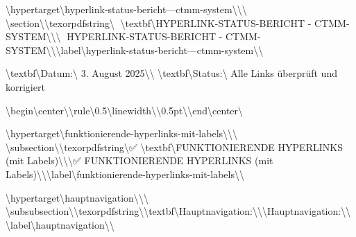 \textbackslash{}hypertarget\textbackslash{}{hyperlink-status-bericht---ctmm-system\textbackslash{}}\textbackslash{}{\textbackslash{}%
\textbackslash{}section\textbackslash{}{\textbackslash{}texorpdfstring\textbackslash{}{🔗 \textbackslash{}textbf\textbackslash{}{HYPERLINK-STATUS-BERICHT - CTMM-SYSTEM\textbackslash{}}\textbackslash{}}\textbackslash{}{🔗 HYPERLINK-STATUS-BERICHT - CTMM-SYSTEM\textbackslash{}}\textbackslash{}}\textbackslash{}label\textbackslash{}{hyperlink-status-bericht---ctmm-system\textbackslash{}}\textbackslash{}}

\textbackslash{}textbf\textbackslash{}{Datum:\textbackslash{}} 3. August 2025\textbackslash{}\textbackslash{}
\textbackslash{}textbf\textbackslash{}{Status:\textbackslash{}} Alle Links überprüft und korrigiert

\textbackslash{}begin\textbackslash{}{center\textbackslash{}}\textbackslash{}rule\textbackslash{}{0.5\textbackslash{}linewidth\textbackslash{}}\textbackslash{}{0.5pt\textbackslash{}}\textbackslash{}end\textbackslash{}{center\textbackslash{}}

\textbackslash{}hypertarget\textbackslash{}{funktionierende-hyperlinks-mit-labels\textbackslash{}}\textbackslash{}{\textbackslash{}%
\textbackslash{}subsection\textbackslash{}{\textbackslash{}texorpdfstring\textbackslash{}{✅ \textbackslash{}textbf\textbackslash{}{FUNKTIONIERENDE HYPERLINKS (mit Labels)\textbackslash{}}\textbackslash{}}\textbackslash{}{✅ FUNKTIONIERENDE HYPERLINKS (mit Labels)\textbackslash{}}\textbackslash{}}\textbackslash{}label\textbackslash{}{funktionierende-hyperlinks-mit-labels\textbackslash{}}\textbackslash{}}

\textbackslash{}hypertarget\textbackslash{}{hauptnavigation\textbackslash{}}\textbackslash{}{\textbackslash{}%
\textbackslash{}subsubsection\textbackslash{}{\textbackslash{}texorpdfstring\textbackslash{}{\textbackslash{}textbf\textbackslash{}{Hauptnavigation:\textbackslash{}}\textbackslash{}}\textbackslash{}{Hauptnavigation:\textbackslash{}}\textbackslash{}}\textbackslash{}label\textbackslash{}{hauptnavigation\textbackslash{}}\textbackslash{}}

